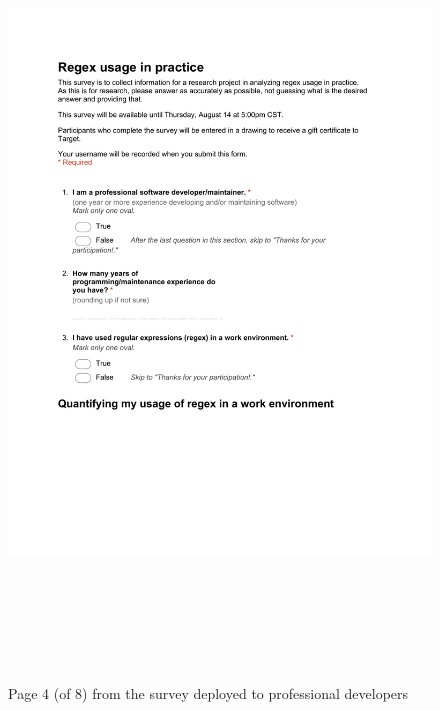 \begin{figure}[!htbp]
   \centering
       \includegraphics[page=4, height=21cm,keepaspectratio]{nontex/appendix/regexUsageInPracticeSurvey}
 \caption{Page 4 (of 8) from the survey deployed to professional developers}
 \label{fig:surveyPDF4}
\end{figure}
